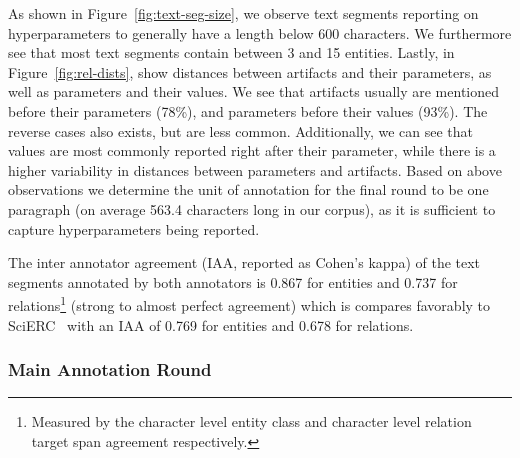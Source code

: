 As shown in Figure~\ref{fig:text-seg-size}, we observe text segments reporting on hyperparameters to generally have a length below 600 characters. %
We furthermore see that most text segments contain between 3 and 15 entities. %
Lastly, in Figure~\ref{fig:rel-dists}, show distances between artifacts and their parameters, as well as parameters and their values. We see that artifacts usually are mentioned before their parameters (78\%), and parameters before their values (93\%). The reverse cases also exists, but are less common.
Additionally, we can see that values are most commonly reported right after their parameter, while there is a higher variability in distances between parameters and artifacts.
Based on above observations %
we determine the unit of annotation for the final round to be one paragraph (on average 563.4 characters long in our corpus), as it is sufficient to capture hyperparameters being reported.

The inter annotator agreement (IAA, reported as Cohen's kappa) of the text segments annotated by both annotators is 0.867 for entities and 0.737 for relations\footnote{Measured by the character level entity class and character level relation target span agreement respectively.} (strong to almost perfect agreement) which is compares favorably to SciERC~\cite{luan2018scierc} with an IAA of 0.769 for entities and 0.678 for relations.



\subsubsection{Main Annotation Round}

